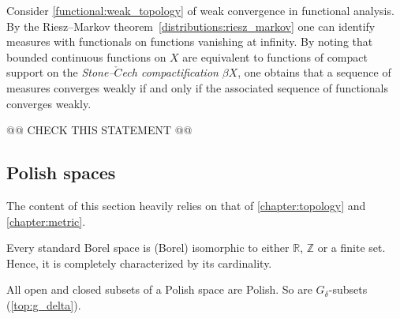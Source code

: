     \begin{remark}
        Consider \cref{functional:weak_topology} of weak convergence in functional analysis. By the Riesz--Markov theorem~\ref{distributions:riesz_markov} one can identify measures with functionals on functions vanishing at infinity. By noting that bounded continuous functions on $X$ are equivalent to functions of compact support on the \textit{Stone--$\check{C}$ech compactification} $\beta X$, one obtains that a sequence of measures converges weakly if and only if the associated sequence of functionals converges weakly.

        @@ CHECK THIS STATEMENT @@
    \end{remark}

\subsection{Polish spaces}

    The content of this section heavily relies on that of \cref{chapter:topology} and \cref{chapter:metric}.


    \begin{theorem}[Kuratowski]
        Every standard Borel space is (Borel) isomorphic to either $\mathbb{R}$, $\mathbb{Z}$ or a finite set. Hence, it is completely characterized by its cardinality.
    \end{theorem}

    \begin{property}
        All open and closed subsets of a Polish space are Polish. So are $G_\delta$-subsets (\cref{top:g_delta}).
    \end{property}


